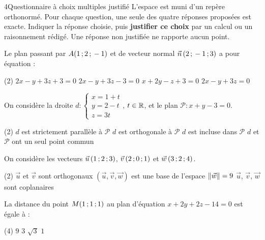 \begin{exoBac}{4}{Questionnaire à choix multiples justifié}
L'espace est muni d'un repère orthonormé. Pour chaque question, une seule des quatre réponses proposées est exacte. Indiquer la
réponse choisie, puis \textbf{justifier ce choix} par un calcul ou un raisonnement rédigé. Une réponse non justifiée ne rapporte
aucun point.
\begin{questions}
  \item Le plan passant par $A(1\,{;}\,2\,{;}\,-1)$ et de vecteur normal $\vec n\,(2\,{;}\,-1\,{;}\,3)$ a pour équation :
\begin{tasks}[label=\alph*)](2)
  \task $2x-y+3z+3=0$
  \task $2x-y+3z-3=0$
  \task $x+2y-z+3=0$
  \task $2x-y+3z=0$
\end{tasks}
  \item On considère la droite $d:\begin{cases}x=1+t\\y=2-t\\z=3t\end{cases}$, $t\in\mathbb{R}$, et le plan $\mathcal{P}:x+y-3=0$.
\begin{tasks}[label=\alph*)](2)
  \task $d$ est strictement parallèle à $\mathcal{P}$
  \task $d$ est orthogonale à $\mathcal{P}$
  \task $d$ est incluse dans $\mathcal{P}$
  \task $d$ et $\mathcal{P}$ ont un seul point commun
\end{tasks}
  \item On considère les vecteurs $\vec u\,(1\,{;}\,2\,{;}\,3)$, $\vec v\,(2\,{;}\,0\,{;}\,1)$ et $\vec w\,(3\,{;}\,2\,{;}\,4)$.
\begin{tasks}[label=\alph*)](2)
  \task $\vec u$ et $\vec v$ sont orthogonaux
  \task $(\vec u,\vec v,\vec w)$ est une base de l'espace
  \task $\left\lVert\vec w\right\rVert=9$
  \task $\vec u$, $\vec v$, $\vec w$ sont coplanaires
\end{tasks}
  \item La distance du point $M(1\,{;}\,1\,{;}\,1)$ au plan d'équation $x+2y+2z-14=0$ est égale à :
\begin{tasks}[label=\alph*)](4)
  \task $9$
  \task $3$
  \task $\sqrt3$
  \task $1$
\end{tasks}
\end{questions}
\end{exoBac}


